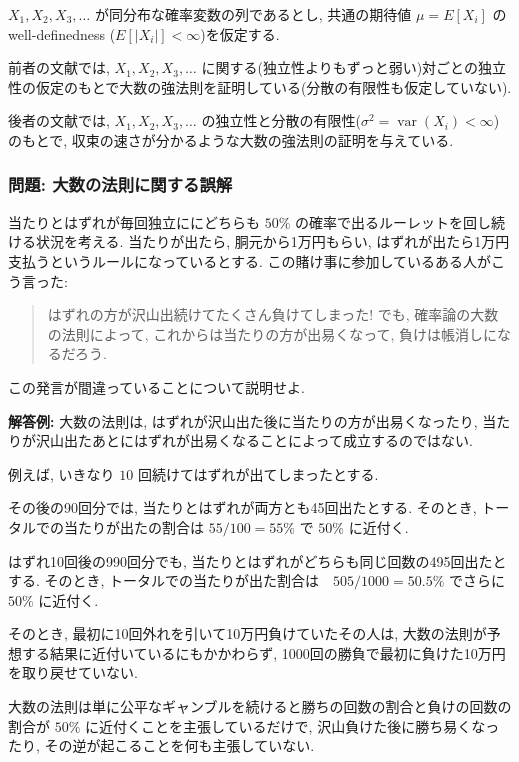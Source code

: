 \documentclass[
  letterpaper,
  DIV=11,
  numbers=noendperiod]{scrartcl}
\begin{document}
\(X_1,X_2,X_3,\ldots\) が同分布な確率変数の列であるとし, 共通の期待値
\(\mu=E[X_i]\) のwell-definedness (\(E[|X_i|]<\infty\))を仮定する.

前者の文献では, \(X_1,X_2,X_3,\ldots\)
に関する(独立性よりもずっと弱い)対ごとの独立性の仮定のもとで大数の強法則を証明している(分散の有限性も仮定していない).

後者の文献では, \(X_1,X_2,X_3,\ldots\)
の独立性と分散の有限性(\(\sigma^2 = \operatorname{var}(X_i)<\infty\))のもとで,
収束の速さが分かるような大数の強法則の証明を与えている.

\hypertarget{ux554fux984c-ux5927ux6570ux306eux6cd5ux5247ux306bux95a2ux3059ux308bux8aa4ux89e3}{%
\subsubsection{問題:
大数の法則に関する誤解}\label{ux554fux984c-ux5927ux6570ux306eux6cd5ux5247ux306bux95a2ux3059ux308bux8aa4ux89e3}}

当たりとはずれが毎回独立ににどちらも \(50\%\)
の確率で出るルーレットを回し続ける状況を考える. 当たりが出たら,
胴元から1万円もらい,
はずれが出たら1万円支払うというルールになっているとする.
この賭け事に参加しているある人がこう言った:

\begin{quote}
はずれの方が沢山出続けてたくさん負けてしまった! でも,
確率論の大数の法則によって, これからは当たりの方が出易くなって,
負けは帳消しになるだろう.
\end{quote}

この発言が間違っていることについて説明せよ.

\textbf{解答例:} 大数の法則は,
はずれが沢山出た後に当たりの方が出易くなったり,
当たりが沢山出たあとにはずれが出易くなることによって成立するのではない.

例えば, いきなり \(10\) 回続けてはずれが出てしまったとする.

その後の90回分では, 当たりとはずれが両方とも45回出たとする. そのとき,
トータルでの当たりが出たの割合は \(55/100=55\%\) で \(50\%\) に近付く.

はずれ10回後の990回分でも,
当たりとはずれがどちらも同じ回数の495回出たとする. そのとき,
トータルでの当たりが出た割合は　\(505/1000 = 50.5\%\) でさらに \(50\%\)
に近付く.

そのとき, 最初に10回外れを引いて10万円負けていたその人は,
大数の法則が予想する結果に近付いているにもかかわらず,
1000回の勝負で最初に負けた10万円を取り戻せていない.

大数の法則は単に公平なギャンブルを続けると勝ちの回数の割合と負けの回数の割合が
\(50\%\) に近付くことを主張しているだけで,
沢山負けた後に勝ち易くなったり, その逆が起こることを何も主張していない.
\end{document}
